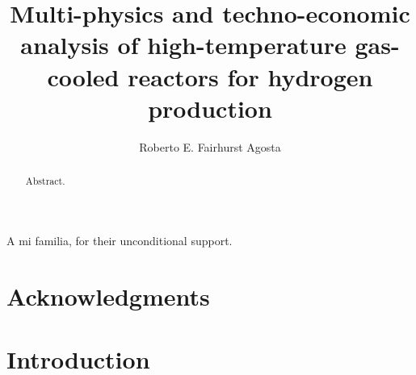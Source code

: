 \documentclass[edeposit,fullpage]{uiucthesis2018}
\title{Multi-physics and techno-economic analysis of high-temperature gas-cooled reactors for hydrogen production}
\author{Roberto E. Fairhurst Agosta}
\begin{document}
\maketitle

\frontmatter
\begin{abstract}

Abstract.

\end{abstract}

\begin{dedication}
A mi familia, for their unconditional support.
\end{dedication}

\chapter*{Acknowledgments}



\tableofcontents
\listoftables
\listoffigures


\pagebreak
\mainmatter

\chapter{Introduction}

\end{document}
